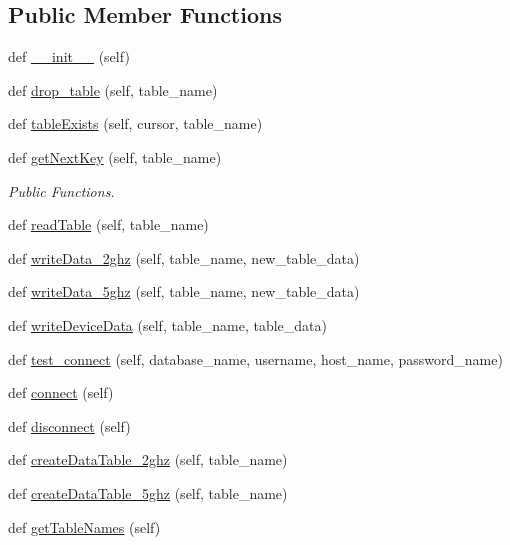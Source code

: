\subsection*{Public Member Functions}
\begin{DoxyCompactItemize}
\item 
def \mbox{\hyperlink{classDatabaseConnector_1_1DatabaseConnect_adafc2b78cab3df24b9f1f88990f88ac7}{\+\_\+\+\_\+init\+\_\+\+\_\+}} (self)
\item 
def \mbox{\hyperlink{classDatabaseConnector_1_1DatabaseConnect_af1f925cf8ade6d18f6046dc50a9acca4}{drop\+\_\+table}} (self, table\+\_\+name)
\item 
def \mbox{\hyperlink{classDatabaseConnector_1_1DatabaseConnect_a2e58b915bdd35d819f25c110d258adc7}{table\+Exists}} (self, cursor, table\+\_\+name)
\item 
def \mbox{\hyperlink{classDatabaseConnector_1_1DatabaseConnect_a2fea409b9f5b72e8c36f0dd0a8515253}{get\+Next\+Key}} (self, table\+\_\+name)
\begin{DoxyCompactList}\small\item\em Public Functions. \end{DoxyCompactList}\item 
def \mbox{\hyperlink{classDatabaseConnector_1_1DatabaseConnect_a18f9d359811b7bdab423f052fe65e05b}{read\+Table}} (self, table\+\_\+name)
\item 
def \mbox{\hyperlink{classDatabaseConnector_1_1DatabaseConnect_a673147e525a51876bbfbb450c5ed5c6b}{write\+Data\+\_\+2ghz}} (self, table\+\_\+name, new\+\_\+table\+\_\+data)
\item 
def \mbox{\hyperlink{classDatabaseConnector_1_1DatabaseConnect_a350c2fab7093d56de4c4faa4f5f03412}{write\+Data\+\_\+5ghz}} (self, table\+\_\+name, new\+\_\+table\+\_\+data)
\item 
def \mbox{\hyperlink{classDatabaseConnector_1_1DatabaseConnect_af67bc1a7983d83e2df140bc3cec92d84}{write\+Device\+Data}} (self, table\+\_\+name, table\+\_\+data)
\item 
def \mbox{\hyperlink{classDatabaseConnector_1_1DatabaseConnect_ace97a586dd4e041b3815fd61c7b889b6}{test\+\_\+connect}} (self, database\+\_\+name, username, host\+\_\+name, password\+\_\+name)
\item 
def \mbox{\hyperlink{classDatabaseConnector_1_1DatabaseConnect_a9d31fcb5c4b23c692a0488ab8633ba78}{connect}} (self)
\item 
def \mbox{\hyperlink{classDatabaseConnector_1_1DatabaseConnect_aeb9d5d3e55d60d137d938c8ba6f696b7}{disconnect}} (self)
\item 
def \mbox{\hyperlink{classDatabaseConnector_1_1DatabaseConnect_ac121de72ce309000ddc108a1a6c1cc09}{create\+Data\+Table\+\_\+2ghz}} (self, table\+\_\+name)
\item 
def \mbox{\hyperlink{classDatabaseConnector_1_1DatabaseConnect_a196df8f48a469a71b10192b98529ca3f}{create\+Data\+Table\+\_\+5ghz}} (self, table\+\_\+name)
\item 
def \mbox{\hyperlink{classDatabaseConnector_1_1DatabaseConnect_a2ea501b906d72bac48ea7bc92ae87044}{get\+Table\+Names}} (self)
\end{DoxyCompactItemize}

